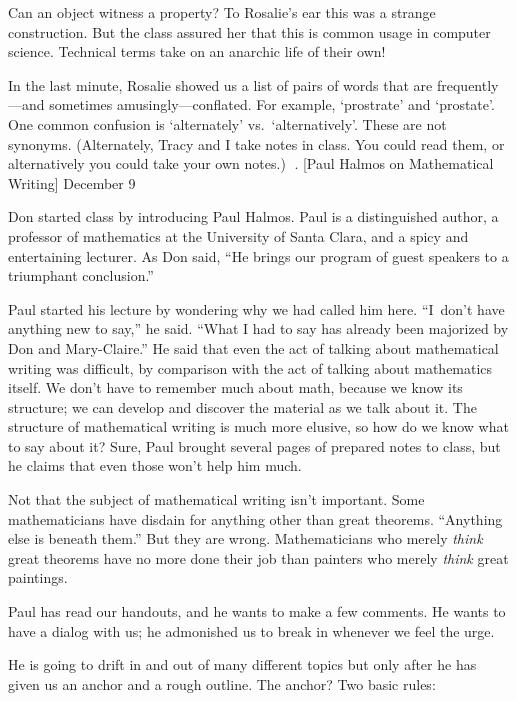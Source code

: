 Can an object witness a property? To Rosalie's ear this was a strange
construction. But the class assured her that this is common usage in
computer science. Technical terms take on an anarchic life of their
own!

In the last minute, Rosalie showed us a list of pairs of words that are
frequently---and sometimes amusingly---conflated. For example, `prostrate'
and `prostate'.  
One common confusion is `alternately' vs.\
`alternatively'. These are not synonyms. (Alternately, Tracy and I take
notes in class. You could read them, or alternatively you could take
your own notes.)
. [Paul Halmos on Mathematical Writing] \tll December 9

Don started class by introducing Paul Halmos.  Paul is a distinguished
 author, a
professor of mathematics at the University of Santa Clara, and a spicy and
entertaining lecturer.  As Don said, ``He brings our program of guest
speakers to a triumphant conclusion.''

Paul started his lecture by wondering why we had called him here.
``I~don't have anything new to say,'' he said. ``What I had to say has already
been majorized by Don and Mary-Claire.'' He said that even the act of
talking about mathematical
writing was difficult, by comparison with the act of talking about
mathematics itself. We don't have to remember 
much about math, because we know its structure; we can
develop and discover the material as we talk about it. The structure of
mathematical writing is much more elusive,
so how do we know what to say about it? Sure, Paul brought
several pages of prepared notes to class, but he claims that even those
won't help him much.  

Not that the subject of
mathematical writing isn't important.  Some mathematicians have disdain
for anything other than great theorems. ``Anything else is beneath them.''
But they are wrong. Mathematicians who merely {\it think\/} great theorems
have no more
done their job than painters who merely {\it think\/} great paintings.

Paul has read our handouts, and he wants to make a few comments.
He wants to have a dialog with us; he admonished us to break in
whenever we feel the urge.

He is going to drift in and out of many different topics but only after
he has given us an anchor and a rough outline.  The anchor?  Two basic rules:

\nobreak\smallskip
{}

